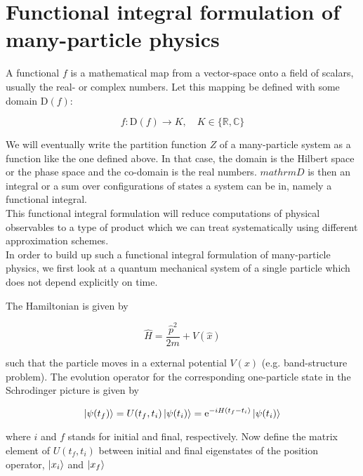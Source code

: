 \section*{Functional integral formulation of many-particle physics}

A functional $f$ is a mathematical map from a vector-space onto a field of scalars, usually the real- or complex numbers. Let this mapping be defined with some domain $\mathrm{D}(f)$: 

\begin{equation*}
    f: \mathrm{D}(f) \to K, \quad K \in \{\mathbb{R}, \mathbb{C} \}
\end{equation*}

We will eventually write the partition function $Z$ of a many-particle system as a function like the one defined above. In that case, the domain is the Hilbert space or the phase space and the co-domain is the real numbers. $mathrm{D}$ is then an integral or a sum over configurations of states a system can be in, namely a functional integral. \\

This functional integral formulation will reduce computations of physical observables to a type of product which we can treat systematically using different approximation schemes. \\ 

In order to build up such a functional integral formulation of many-particle physics, we first look at a quantum mechanical system of a single particle which does not depend explicitly on time. 

The Hamiltonian is given by 

\begin{equation*}
    \hat{H} = \frac{\hat{p}^{2}}{2m} + V(\hat{x})
\end{equation*}

such that the particle moves in a external potential $V(x)$ (e.g. band-structure problem). The evolution operator for the corresponding one-particle state in the Schrodinger picture is given by 

\begin{equation*}
    \ket{\psi(t_{f})} = U(t_{f}, t_{i})\ket{\psi(t_{i})} = \mathrm{e}^{-iH(t_{f} - t_{i})}\ket{\psi(t_{i})}
\end{equation*}

where $i$ and $f$ stands for initial and final, respectively. Now define the matrix element of $U(t_{f},t_{i})$ between initial and final eigenstates of the position operator, $\ket{x_{i}}$ and $\ket{x_{f}}$ \\ 

